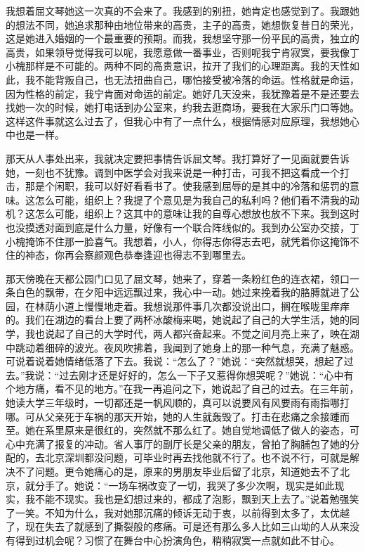 \documentclass[12pt,oneside]{book}
\begin{document}
我想着屈文琴她这一次真的不会来了。我感到的别扭，她肯定也感觉到了。我跟她的想法不同，她追求那种由地位带来的高贵，主子的高贵，她想恢复昔日的荣光，这是她进入婚姻的一个最重要的预期。而我，我想坚守那一份平民的高贵，独立的高贵，如果领导觉得我可以呢，我愿意做一番事业，否则呢我宁肯寂寞，要我像丁小槐那样是不可能的。两种不同的高贵意识，拉开了我们的心理距离。我的天性如此，我不能背叛自己，也无法扭曲自己，哪怕接受被冷落的命运。性格就是命运，因为性格的前定，我宁肯面对命运的前定。她好几天没来，我犹豫着是不是还要去找她一次的时候，她打电话到办公室来，约我去逛商场，要我在大家乐门口等她。这样这件事就这么过去了，但我心中有了一点什么，根据情感对应原理，我想她心中也是一样。

那天从人事处出来，我就决定要把事情告诉屈文琴。我打算好了一见面就要告诉她，一刻也不犹豫。调到中医学会对我来说是一种打击，可我不把这看成一个打击，那是个闲职，我可以好好看看书了。使我感到屈辱的是其中的冷落和惩罚的意味。这怎么可能，组织上？我提了个意见是为我自己的私利吗？他们看不清我的动机？这怎么可能，组织上？这其中的意味让我的自尊心想放也放不下来。我到这时也没摸透对面到底是什么力量，好像有一个联合阵线似的。我到办公室办交接，丁小槐掩饰不住那一脸喜气。我想着，小人，你得志你得志去吧，就凭着你这掩饰不住的神态，你再会察颜观色恭奉逢迎也得志不到哪里去。

那天傍晚在天都公园门口见了屈文琴，她来了，穿着一条粉红色的连衣裙，领口一条白色的飘带，在夕阳中远远飘过来，我心中一动。她过来挽着我的胳膊就进了公园，在林荫小道上慢慢地走着。我想说那件事几次都没说出口，搁在喉咙里痒痒的。我们在湖边的看台上要了两杯冰酸梅来喝，她说起了自己的大学生活，她的同学，我也说起了自己的大学时代，两人都兴奋起来。不觉之间月亮上来了，映在湖中跳动着细碎的波光。夜风吹拂着，我闻到了她身上的那一种气息，充满了魅惑。可说着说着她情绪低落了下去。我说：``怎么了？''她说：``突然就想哭，想起了过去。''我说：``过去刚才还是好好的，怎么一下子又惹得你想哭呢？''她说：``心中有个地方痛，看不见的地方。''在我一再追问之下，她说起了自己的过去。在三年前，她读大学三年级时，一切都还是一帆风顺的，真可以说要风有风要雨有雨指哪打哪。可从父亲死于车祸的那天开始，她的人生就轰毁了。打击在悲痛之余接踵而至。她在系里原来是很红的，突然就不那么红了。她自觉地调低了做人的姿态，可心中充满了报复的冲动。省人事厅的副厅长是父亲的朋友，曾拍了胸脯包了她的分配的，去北京深圳都没问题，可毕业时再去找他就不行了。也不说不行，可就是解决不了问题。更令她痛心的是，原来的男朋友毕业后留了北京，知道她去不了北京，就分手了。她说：``一场车祸改变了一切，我哭了多少次啊，现实是如此现实，我不能不现实。我也是幻想过来的，都成了泡影，飘到天上去了。''说着勉强笑了一笑。不知为什么，我对她那沉痛的倾诉无动于衷，以前得到太多了，太优越了，现在失去了就感到了撕裂般的疼痛。可是还有那么多人比如三山坳的人从来没有得到过机会呢？习惯了在舞台中心扮演角色，稍稍寂寞一点就如此不甘心。
\end{document}
